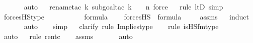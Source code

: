 \begin{isabellebody}
\ \ \ \ \ \isamarkupfalse%
\ auto{\isacharbrackleft}{\kern0pt}{}{\isacharbrackright}{\kern0pt}\isanewline
\ \ \isamarkupfalse%
{\isacharparenleft}{\kern0pt}rename{\isacharunderscore}{\kern0pt}tac\ k{\isacharcomma}{\kern0pt}\ subgoal{\isacharunderscore}{\kern0pt}tac\ {\isachardoublequoteopen}k\ {\isasymin}\ {}\ {\isasymunion}\ n{\isachardoublequoteclose}{\isacharcomma}{\kern0pt}\ force{\isacharparenright}{\kern0pt}\isanewline
\ \ \isamarkupfalse%
{\isacharparenleft}{\kern0pt}rule\ ltD{\isacharcomma}{\kern0pt}\ simp{\isacharparenright}{\kern0pt}\isanewline
\ \ \isamarkupfalse%
%
\endisatagproof
{\isafoldproof}%
%
\isadelimproof
\isanewline
%
\endisadelimproof
\isanewline
{}\isamarkupfalse%
\ forcesHS{\isacharprime}{\kern0pt}{\isacharunderscore}{\kern0pt}type\ {\isacharcolon}{\kern0pt}\ \isanewline
\ \ \ {\isasymphi}\isanewline
\ \ \ {\isachardoublequoteopen}{\isasymphi}\ {\isasymin}\ formula{\isachardoublequoteclose}\ \isanewline
\ \ \ {\isachardoublequoteopen}forcesHS{\isacharprime}{\kern0pt}{\isacharparenleft}{\kern0pt}{\isasymphi}{\isacharparenright}{\kern0pt}\ {\isasymin}\ formula{\isachardoublequoteclose}\ \isanewline
%
\isadelimproof
\ \ %
\endisadelimproof
%
\isatagproof
{}\isamarkupfalse%
\ assms\isanewline
\ \ \isamarkupfalse%
{\isacharparenleft}{\kern0pt}induct{\isacharparenright}{\kern0pt}\isanewline
\ \ \ \ \ \isamarkupfalse%
\ auto{\isacharbrackleft}{\kern0pt}{}{\isacharbrackright}{\kern0pt}\isanewline
\ \ \isamarkupfalse%
\ simp\isanewline
\ \ \isamarkupfalse%
{\isacharparenleft}{\kern0pt}clarify{\isacharcomma}{\kern0pt}\ rule\ Implies{\isacharunderscore}{\kern0pt}type{\isacharparenright}{\kern0pt}\isanewline
\ \ \ \isamarkupfalse%
{\isacharparenleft}{\kern0pt}rule\ is{\isacharunderscore}{\kern0pt}HS{\isacharunderscore}{\kern0pt}fm{\isacharunderscore}{\kern0pt}type{\isacharparenright}{\kern0pt}\isanewline
\ \ \ \ \isamarkupfalse%
\ auto{\isacharbrackleft}{\kern0pt}{}{\isacharbrackright}{\kern0pt}\isanewline
\ \ \isamarkupfalse%
{\isacharparenleft}{\kern0pt}rule\ ren{\isacharunderscore}{\kern0pt}tc{\isacharparenright}{\kern0pt}\isanewline
\ \ \isamarkupfalse%
\ assms\isanewline
\ \ \ \ \ \isamarkupfalse%
\ auto{\isacharbrackleft}{\kern0pt}{}{\isacharbrackright}{\kern0pt}\isanewline

\end{isabellebody}
